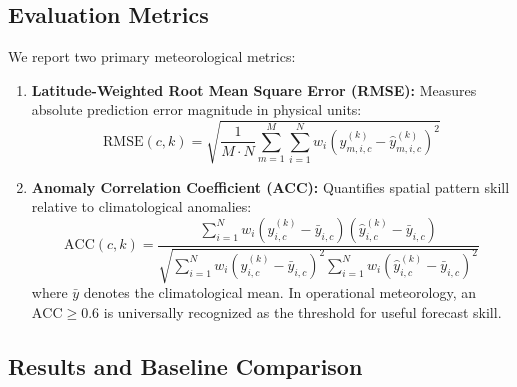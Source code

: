 \subsection{Evaluation Metrics}
We report two primary meteorological metrics:
\begin{enumerate}
    \item \textbf{Latitude-Weighted Root Mean Square Error (RMSE):} Measures absolute prediction error magnitude in physical units:
    \begin{equation}
    \text{RMSE}(c, k) = \sqrt{\frac{1}{M \cdot N} \sum_{m=1}^M \sum_{i=1}^N w_i \left(y_{m, i, c}^{(k)} - \hat{y}_{m, i, c}^{(k)}\right)^2}
    \end{equation}
    \item \textbf{Anomaly Correlation Coefficient (ACC):} Quantifies spatial pattern skill relative to climatological anomalies:
    \begin{equation}
    \text{ACC}(c, k) = \frac{\sum_{i=1}^N w_i \left(y_{i, c}^{(k)} - \bar{y}_{i, c}\right) \left(\hat{y}_{i, c}^{(k)} - \bar{y}_{i, c}\right)}{\sqrt{\sum_{i=1}^N w_i \left(y_{i, c}^{(k)} - \bar{y}_{i, c}\right)^2 \sum_{i=1}^N w_i \left(\hat{y}_{i, c}^{(k)} - \bar{y}_{i, c}\right)^2}}
    \end{equation}
    where $\bar{y}$ denotes the climatological mean. In operational meteorology, an $\text{ACC} \ge 0.6$ is universally recognized as the threshold for useful forecast skill.
\end{enumerate}

\subsection{Results and Baseline Comparison}

